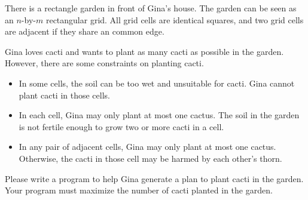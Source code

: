There is a rectangle garden in front of Gina's house.
The garden can be seen as an $n$-by-$m$ rectangular grid.
All grid cells are identical squares, and two grid cells are adjacent 
if they share an common edge.

Gina loves cacti and wants to plant as many cacti as possible in the garden.
However, there are some constraints on planting cacti.
\begin{itemize}
\item In some cells, the soil can be too wet and unsuitable for cacti.
Gina cannot plant cacti in those cells.
\item In each cell, Gina may only plant at most one cactus. The soil in the 
garden is not fertile enough to grow two or more cacti in a cell.
\item In any pair of adjacent cells, Gina may only plant at most one cactus.
Otherwise, the cacti in those cell may be harmed by each other's thorn.
\end{itemize}

Please write a program to help Gina generate a plan to plant cacti in the 
garden. Your program must maximize the number of cacti planted in the garden.
